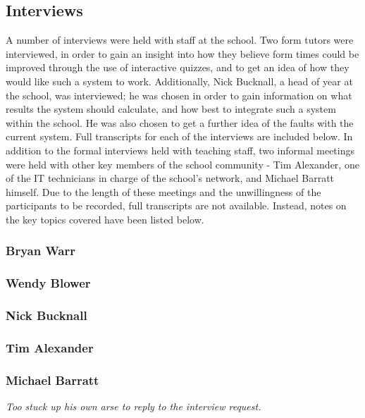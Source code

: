 \subsection{Interviews}

A number of interviews were held with staff at the school. Two form tutors were interviewed, in order to gain an insight into how they believe form times could be improved through the use of interactive quizzes, and to get an idea of how they would like such a system to work. Additionally, Nick Bucknall, a head of year at the school, was interviewed; he was chosen in order to gain information on what results the system should calculate, and how best to integrate such a system within the school. He was also chosen to get a further idea of the faults with the current system. Full transcripts for each of the interviews are included below. In addition to the formal interviews held with teaching staff, two informal meetings were held with other key members of the school community - Tim Alexander, one of the IT technicians in charge of the school's network, and Michael Barratt himself. Due to the length of these meetings and the unwillingness of the participants to be recorded, full transcripts are not available. Instead, notes on the key topics covered have been listed below.

\subsubsection{Bryan Warr}


\subsubsection{Wendy Blower}



\subsubsection{Nick Bucknall}



\subsubsection{Tim Alexander}



\subsubsection{Michael Barratt}

\textit{Too stuck up his own arse to reply to the interview request.}